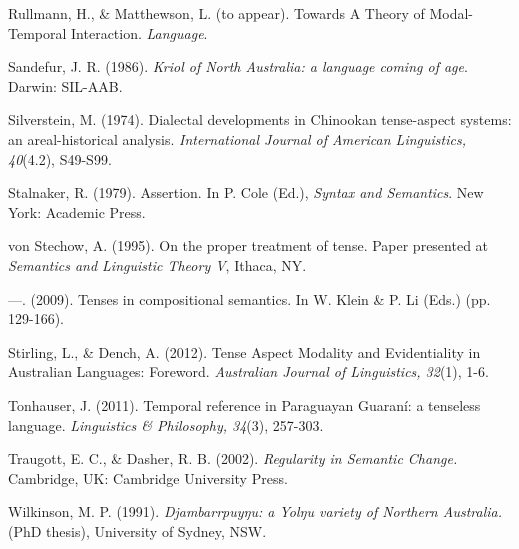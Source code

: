 \documentclass[12pt]{article}
\begin{document}
\begin{hangparas}{3em}{1}
Rullmann, H., \& Matthewson, L. (to appear). Towards A Theory of Modal-Temporal Interaction. \textit{Language}. 

Sandefur, J. R. (1986).\textit{ Kriol of North Australia: a language coming of age}. Darwin: SIL-AAB.

Silverstein, M. (1974). Dialectal developments in Chinookan tense-aspect systems: an areal-historical analysis. \textit{International Journal of American Linguistics, 40}(4.2), S49-S99. 


Stalnaker, R. (1979). Assertion. In P. Cole (Ed.), \textit{Syntax and Semantics}. New York: Academic Press.

von Stechow, A. (1995). On the proper treatment of tense. Paper presented at \textit{Semantics and Linguistic Theory V}, Ithaca, NY. 


---. (2009). Tenses in compositional semantics. In W. Klein \& P. Li (Eds.) (pp. 129-166). 

Stirling, L., \& Dench, A. (2012). Tense Aspect Modality and Evidentiality in Australian Languages: Foreword.\textit{ Australian Journal of Linguistics, 32}(1), 1-6. 

Tonhauser, J. (2011). Temporal reference in Paraguayan Guaraní: a tenseless language. \textit{Linguistics \& Philosophy, 34}(3), 257-303. 

Traugott, E. C., \& Dasher, R. B. (2002). \textit{Regularity in Semantic Change.} Cambridge, UK: Cambridge University Press.


Wilkinson, M. P. (1991). \textit{Djambarrpuyŋu: a Yolŋu variety of Northern Australia.} (PhD thesis), University of Sydney, NSW.   


\end{hangparas}\vspace*{.75in}
\end{document}

